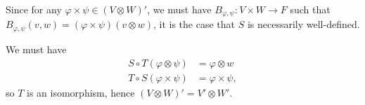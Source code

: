 \documentclass[10pt]{mypackage}
\begin{document}
\begin{solution}
\begin{enumerate}[(a)]
      Since for any $\varphi\times \psi\in \left(V\otimes W\right)'$, we must have $B_{\varphi,\psi}:V\times W\rightarrow F$ such that $B_{\varphi,\psi}\left(v,w\right) = \left(\varphi\times\psi\right)\left(v\otimes w\right)$, it is the case that $S$ is necessarily well-defined.\newline

      We must have
      \begin{align*}
        S\circ T\left(\varphi\otimes \psi\right) &= \varphi\otimes w\\
        T\circ S\left(\varphi\times \psi\right) &= \varphi\times \psi,
      \end{align*}
      so $T$ is an isomorphism, hence $\left(V\otimes W\right)' = V'\otimes W'$.
  \end{enumerate}
\end{solution}
\end{document}
